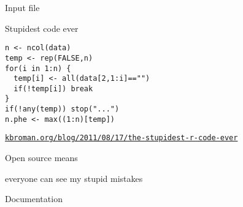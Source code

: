 \documentclass[aspectratio=169,12pt,t]{beamer}
\begin{document}
\begin{frame}[c]{Input file}


\note{
}
\end{frame}


\begin{frame}[c,fragile]{Stupidest code ever}

\begin{center}
\begin{minipage}[c]{9.3cm}
\begin{semiverbatim}
\lstset{basicstyle=\normalsize}
\begin{lstlisting}[linewidth=9.3cm]
n <- ncol(data)
temp <- rep(FALSE,n)
for(i in 1:n) {
  temp[i] <- all(data[2,1:i]=="")
  if(!temp[i]) break
}
if(!any(temp)) stop("...")
n.phe <- max((1:n)[temp])
\end{lstlisting}
\end{semiverbatim}
\end{minipage}
\end{center}

\vspace{3mm}

\hfill \href{http://kbroman.org/blog/2011/08/17/the-stupidest-r-code-ever}{\scriptsize \lolit \tt kbroman.org/blog/2011/08/17/the-stupidest-r-code-ever}

\note{
}
\end{frame}


\begin{frame}[c]{}

  \large

  {\hilit Open source} {\lolit means}

  everyone can see my stupid mistakes

  \bigskip \bigskip \bigskip


\note{
}
\end{frame}


\begin{frame}{}

\vspace*{16.7mm}

\centerline{\Large Documentation}

\note{
}
\end{frame}
\end{document}
